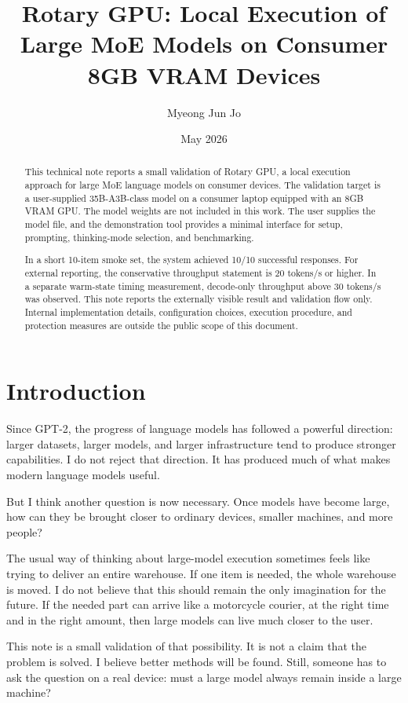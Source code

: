 \documentclass[11pt]{article}
\title{Rotary GPU: Local Execution of Large MoE Models on Consumer 8GB VRAM Devices}
\author{Myeong Jun Jo}
\date{May 2026}
\begin{document}
\maketitle

\begin{abstract}
This technical note reports a small validation of Rotary GPU, a local execution approach for large MoE language models on consumer devices. The validation target is a user-supplied 35B-A3B-class model on a consumer laptop equipped with an 8GB VRAM GPU. The model weights are not included in this work. The user supplies the model file, and the demonstration tool provides a minimal interface for setup, prompting, thinking-mode selection, and benchmarking.

In a short 10-item smoke set, the system achieved 10/10 successful responses. For external reporting, the conservative throughput statement is 20 tokens/s or higher. In a separate warm-state timing measurement, decode-only throughput above 30 tokens/s was observed. This note reports the externally visible result and validation flow only. Internal implementation details, configuration choices, execution procedure, and protection measures are outside the public scope of this document.
\end{abstract}

\section{Introduction}

Since GPT-2, the progress of language models has followed a powerful direction: larger datasets, larger models, and larger infrastructure tend to produce stronger capabilities. I do not reject that direction. It has produced much of what makes modern language models useful.

But I think another question is now necessary. Once models have become large, how can they be brought closer to ordinary devices, smaller machines, and more people?

The usual way of thinking about large-model execution sometimes feels like trying to deliver an entire warehouse. If one item is needed, the whole warehouse is moved. I do not believe that this should remain the only imagination for the future. If the needed part can arrive like a motorcycle courier, at the right time and in the right amount, then large models can live much closer to the user.

This note is a small validation of that possibility. It is not a claim that the problem is solved. I believe better methods will be found. Still, someone has to ask the question on a real device: must a large model always remain inside a large machine?
\end{document}
